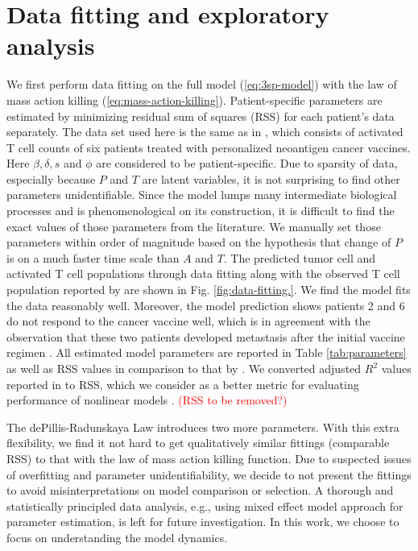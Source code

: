 \documentclass[review,authoryear]{elsarticle}
\newcommand{\red}[1]{\textcolor{red}{#1}}
\begin{document}
\section{Data fitting and exploratory analysis} \label{sec:data}
We first perform data fitting on the full model (\ref{eq:3sp-model}) with the law of mass action killing (\ref{eq:mass-action-killing}). Patient-specific parameters are estimated by minimizing residual sum of squares (RSS) for each patient's data separately. The data set used here is the same as in \cite{Messan2021}, which consists of activated T cell counts of six patients treated with personalized neoantigen cancer vaccines. Here $\beta, \delta, s$ and $\phi$ are considered to be patient-specific. Due to sparsity of data, especially because $P$ and $T$ are latent variables, it is not surprising to find other parameters unidentifiable.  Since the model lumps many intermediate biological processes and is phenomenological on its construction, it is difficult to find the exact values of those parameters from the literature. We manually set those parameters within order of magnitude based on the hypothesis that change of $P$ is on a much faster time scale than $A$ and $T$. The predicted tumor cell and activated T cell populations through data fitting along with the observed T cell population reported by \cite{Ott2017} are shown in Fig. \ref{fig:data-fitting.}. We find the model fits the data reasonably well. Moreover, the model prediction shows patients 2 and 6 do not respond to the cancer vaccine well, which is in agreement with the observation that these two patients developed metastasis after the initial vaccine regimen \citep{Ott2017}. All estimated model parameters are reported in Table \ref{tab:parameters} as well as RSS values in comparison to that by \cite{Messan2021}. We converted adjusted $R^2$ values reported in \cite{Messan2021} to RSS, which we consider as a better metric for evaluating performance of nonlinear models \citep{Spiess2010}. \red{(RSS to be removed?)}

The dePillis-Radunskaya Law introduces two more parameters. With this extra flexibility, we find it not hard to get qualitatively similar fittings (comparable RSS) to that with the law of mass action killing function. Due to suspected issues of overfitting and parameter unidentifiability, we decide to not present the fittings to avoid misinterpretations on model comparison or selection. A thorough and statistically principled data analysis, e.g., using mixed effect model approach for parameter estimation, is left for future investigation. In this work, we choose to focus on understanding the model dynamics.
\end{document}
